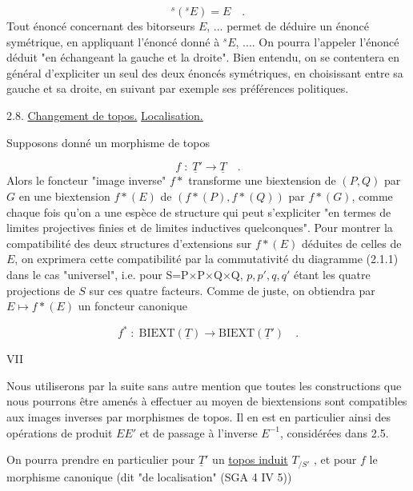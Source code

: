 \begin{equation*}
{}^{s}({}^{s}E) = E \quad .
\end{equation*}
Tout énoncé concernant des bitorseurs $E$, ... permet de déduire un énoncé symétrique, en appliquant l'énoncé donné à $^{s}E$, .... On pourra l'appeler l'énoncé déduit "en échangeant la gauche et la droite". Bien entendu, on se contentera en général d'expliciter un seul des deux énoncés symétriques, en choisissant entre sa gauche et sa droite, en suivant par exemple ses préférences politiques.


2.8.  \underline{Changement de topos.} \underline{Localisation.}

Supposons donné un morphisme de topos

\begin{equation*}
f \;:\; \underline{T}' \longrightarrow \underline{T} \quad .
\end{equation*}
Alors le foncteur "image inverse" $f*$ transforme une biextension de $(P,Q)$ par $G$ en une biextension $f*(E)$ de $(f*(P),f*(Q))$ par $f*(G)$, comme chaque fois qu'on a une espèce de structure qui peut s'expliciter "en termes de limites projectives finies et de limites inductives quelconques". Pour montrer la compatibilité des deux structures d'extensions sur $f*(E)$ déduites de celles de $E$, on exprimera cette compatibilité par la commutativité du diagramme (2.1.1) dans le cas "universel", i.e. pour S=P$\times$P$\times$Q$\times$Q, $p,p',q,q'$ étant les quatre projections de $S$ sur ces quatre facteurs. Comme de juste, on obtiendra par $E \longmapsto f*(E)$ un foncteur canonique

\begin{equation*}
f^{*} \;:\; \mathrm{BIEXT}(\underline{T}) \longrightarrow \mathrm{BIEXT}(\underline{T}') \quad .
\end{equation*}



VII

Nous utiliserons par la suite sans autre mention que toutes les constructions que nous pourrons être amenés à effectuer au moyen de biextensions sont compatibles aux images inverses par morphismes de topos. Il en est en particulier ainsi des opérations de produit $EE'$ et de passage à l'inverse $E^{-1}$, considérées dans 2.5.

On pourra prendre en particulier pour $\underline{T}'$ un \underline{topos induit} $T_{/S'}$ , et pour $f$ le morphisme canonique (dit "de localisation" (SGA 4 IV 5))

